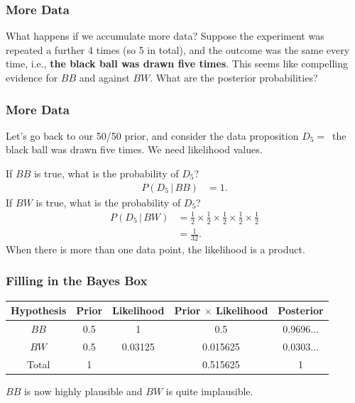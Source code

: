 \documentclass{beamer}
\newcommand{\given}{\,|\,}
\begin{document}
\begin{frame}
\frametitle{More Data}
What happens if we accumulate more data? Suppose the experiment was repeated
a further 4 times (so 5 in total), and the outcome was the same every time,
i.e., {\bf the black ball was drawn five times}. This seems like compelling
evidence for $BB$ and against $BW$. What are the posterior probabilities?

\end{frame}

\begin{frame}
\frametitle{More Data}
Let's go back to our 50/50 prior, and consider the data
proposition $D_5 = $~the black ball was drawn five times.
We need likelihood values.\pause

If $BB$ is true, what is the probability of $D_5$?
\begin{align}
P(D_5 \given BB) &= 1.
\end{align}
\pause
If $BW$ is true, what is the probability of $D_5$?
\begin{align}
P(D_5 \given BW) &= \frac{1}{2}\times\frac{1}{2}\times\frac{1}{2}\times
                    \frac{1}{2}\times\frac{1}{2}\\
                 &= \frac{1}{32}.
\end{align}\pause
When there is more than one data point, the likelihood is a
product.

\end{frame}


\begin{frame}
\frametitle{Filling in the Bayes Box}
\begin{tabular}{|c|c|c|c|c|}
\hline
Hypothesis & Prior & Likelihood & Prior $\times$ Likelihood & Posterior \\
\hline
$BB$ & 0.5 & 1 & 0.5 & 0.9696... \\
$BW$ & 0.5 & 0.03125 & 0.015625 & 0.0303... \\
\hline
Total & 1 & & 0.515625 & 1\\
\hline
\end{tabular}
\pause

$BB$ is now highly plausible and $BW$ is quite implausible.

\end{frame}
\end{document}
